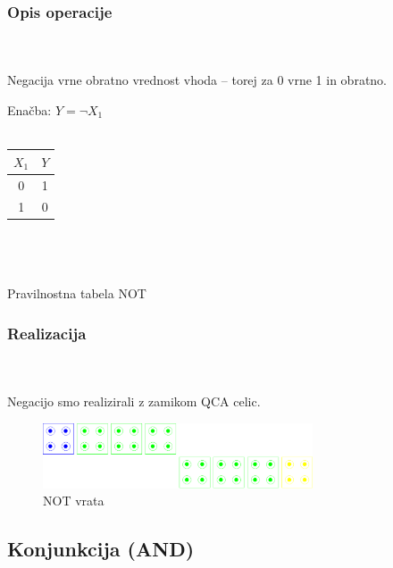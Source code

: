 \documentclass[seminar, slovene]{FRIreport}
\begin{document}
\subsubsection{Opis operacije}\ \\ \ \\
Negacija vrne obratno vrednost vhoda -- torej za 0 vrne 1 in obratno.
\ \\
\begin{table}[H]
\begin{center}
Enačba: $ Y = \lnot X_1 $\\  \ \\
\begin{tabular}{ | c || c | }\hline
$X_1$ & $Y$ \\ \hline
0 & 1 \\
1 & 0 \\ \hline
\end{tabular}\\ \ \\ \ \\
Pravilnostna tabela NOT
\end{center}
\end{table}

\subsubsection{Realizacija}\ \\ \ \\
Negacijo smo realizirali z zamikom QCA celic.
\begin{figure}[H]
\begin{center}
\includegraphics[width=8cm]{qca/img/NOT}
\caption{NOT vrata}
\label{NOT}
\end{center}
\end{figure}
\subsection{Konjunkcija (AND)}
\end{document}
